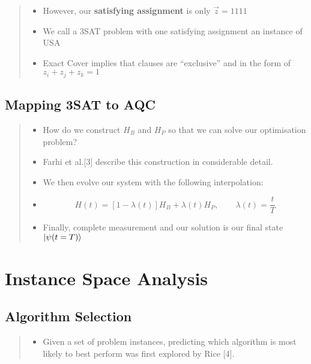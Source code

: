 \documentclass[
]{article}
\providecommand{\tightlist}{%
  \setlength{\itemsep}{0pt}\setlength{\parskip}{0pt}}
\begin{document}
\begin{quote}
\begin{itemize}
\tightlist
\item
  However, our \textbf{satisfying assignment} is only \(\vec{z} = 1111\)
\item
  We call a 3SAT problem with one satisfying assignment an instance of
  USA
\item
  Exact Cover implies that clauses are ``exclusive'' and in the form of
  \(z_i + z_j + z_k = 1\)
\end{itemize}
\end{quote}

\hypertarget{mapping-3sat-to-aqc}{%
\subsection{Mapping 3SAT to AQC}\label{mapping-3sat-to-aqc}}

\begin{quote}
\begin{itemize}
\tightlist
\item
  How do we construct \(H_B\) and \(H_P\) so that we can solve our
  optimisation problem?
\item
  Farhi et al.{[}3{]} describe this construction in considerable detail.
\item
  We then evolve our system with the following interpolation:
\item
  \[
  H(t) = \left[1 - \lambda(t)\right]H_B + \lambda(t)H_P, \qquad \lambda (t) = \frac{t}{T}
  \]
\item
  Finally, complete measurement and our solution is our final state
  \(\ket{\psi(t=T)}\)
\end{itemize}
\end{quote}

\hypertarget{instance-space-analysis}{%
\section{Instance Space Analysis}\label{instance-space-analysis}}

\hypertarget{algorithm-selection}{%
\subsection{Algorithm Selection}\label{algorithm-selection}}

\begin{quote}
\begin{itemize}
\tightlist
\item
  Given a set of problem instances, predicting which algorithm is most
  likely to best perform was first explored by Rice {[}4{]}. \pause
\end{itemize}
\end{quote}
\end{document}
